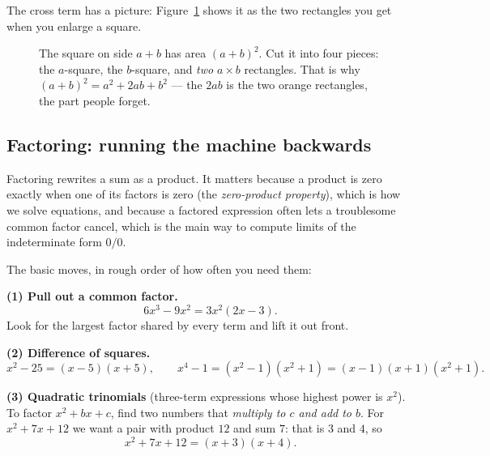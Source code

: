 The cross term has a picture: Figure~\ref{ch40:fig-square} shows it as the two
rectangles you get when you enlarge a square.

\begin{figure}[htbp]
\centering
{}
\caption{The square on side $a+b$ has area $(a+b)^2$. Cut it into four pieces:
the $a$-square, the $b$-square, and \emph{two} $a\times b$ rectangles. That is why
$(a+b)^2 = a^2 + 2ab + b^2$ --- the $2ab$ is the two orange rectangles, the part
people forget.}
\label{ch40:fig-square}
\end{figure}

\subsection{Factoring: running the machine backwards}

Factoring rewrites a sum as a product. It matters because a product is zero
exactly when one of its factors is zero (the \emph{zero-product property}), which
is how we solve equations, and because a factored expression often lets a
troublesome common factor cancel, which is the main way to compute limits of the
indeterminate form $0/0$.

The basic moves, in rough order of how often you need them:

\textbf{(1) Pull out a common factor.}
\[
  6x^3 - 9x^2 = 3x^2(2x - 3).
\]
Look for the largest factor shared by every term and lift it out front.

\textbf{(2) Difference of squares.}
\[
  x^2 - 25 = (x-5)(x+5), \qquad x^4 - 1 = (x^2-1)(x^2+1) = (x-1)(x+1)(x^2+1).
\]

\textbf{(3) Quadratic trinomials} (three-term expressions whose highest power is
$x^2$). To factor $x^2 + bx + c$, find two numbers that
\emph{multiply to $c$ and add to $b$}. For $x^2 + 7x + 12$ we want a pair with
product $12$ and sum $7$: that is $3$ and $4$, so
\[
  x^2 + 7x + 12 = (x+3)(x+4).
\]

